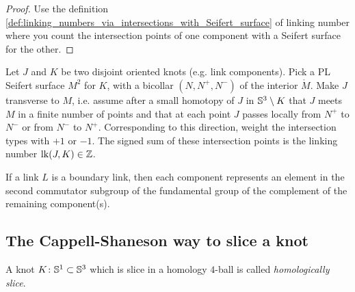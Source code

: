 \begin{proof}
	Use the definition \ref{def:linking_numbers_via_intersections_with_Seifert_surface} 
	of linking number where you count
	the intersection points of one component with a Seifert surface for the
	other.
\end{proof}

\begin{definition}
	\label{def:linking_numbers_via_intersections_with_Seifert_surface}
	Let $J$ and $K$ be two disjoint oriented knots (e.g. link components).
	Pick a PL Seifert surface $M^{2}$ for $K$, with
	a bicollar $(N, N^{+}, N^{-})$ of the interior $\mathring{M}$.
	Make $J$ transverse to $M$, i.e. assume after a small
	homotopy of $J$ in $\mathbb{S}^{3} \setminus K$ that
	$J$ meets $M$ in a finite number of points
	and that at each point $J$ passes locally
	from $N^{+}$ to $N^{-}$ or from $N^{-}$ to $N^{+}$.
	Corresponding to this direction, weight the intersection types
	with $+1$ or $-1$.
	The signed sum of these intersection points is the linking
	number $\operatorname{lk}(J, K) \in \mathbb{Z}$.
\end{definition}

\begin{proposition}
	If a link $L$ is a boundary link, then each component
	represents an element
	in the second commutator subgroup
	of the fundamental group of the complement
	of the remaining component(s).
\end{proposition}

\subsection{The Cappell-Shaneson way to slice a knot}

\citep[4.1]{Teichner2010}

\begin{definition}
	A knot $K \colon \mathbb{S}^{1} \subset \mathbb{S}^{3}$ which is slice in a homology $4$-ball
	is called \textit{homologically slice}.
\end{definition}


